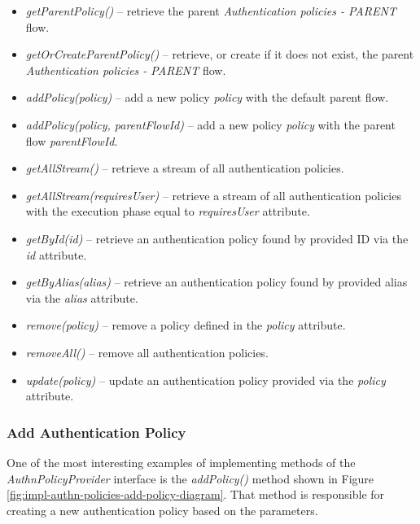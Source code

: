 \begin{itemize}
    \item \textit{getParentPolicy()} -- retrieve the parent \textit{Authentication policies - PARENT} flow.
    \item \textit{getOrCreateParentPolicy()} -- retrieve, or create if it does not exist, the parent \textit{Authentication policies - PARENT} flow.
    \item \textit{addPolicy(policy)} -- add a new policy \textit{policy} with the default parent flow.
    \item \textit{addPolicy(policy, parentFlowId)} -- add a new policy \textit{policy} with the parent flow \textit{parentFlowId}.
    \item \textit{getAllStream()} -- retrieve a stream of all authentication policies.
    \item \textit{getAllStream(requiresUser)} -- retrieve a stream of all authentication policies with the execution phase equal to \textit{requiresUser} attribute.
    \item \textit{getById(id)} -- retrieve an authentication policy found by provided ID via the \textit{id} attribute.
    \item \textit{getByAlias(alias)} -- retrieve an authentication policy found by provided alias via the \textit{alias} attribute.
    \item \textit{remove(policy)} -- remove a policy defined in the \textit{policy} attribute.
    \item \textit{removeAll()} -- remove all authentication policies.
    \item \textit{update(policy)} -- update an authentication policy provided via the \textit{policy} attribute.
\end{itemize}

\newpage
\subsubsection{Add Authentication Policy}
One of the most interesting examples of implementing methods of the \textit{AuthnPolicyProvider} interface is the \textit{addPolicy()} method shown in Figure \ref{fig:impl-authn-policies-add-policy-diagram}.
That method is responsible for creating a new authentication policy based on the parameters.

